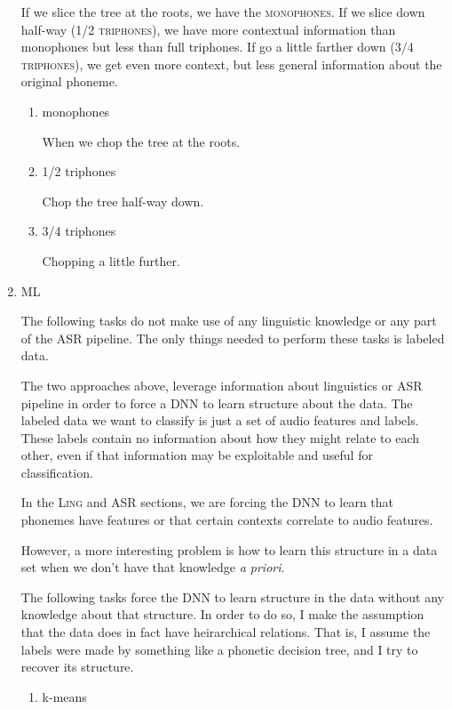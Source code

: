 \documentclass[10pt,a4paper]{article}
\begin{document}
\begin{enumerate}
  If we slice the tree at the roots, we have the \textsc{monophones}. If we slice down half-way (\textsc{1/2 triphones}), we have more contextual information than monophones but less than full triphones. If go a little farther down (\textsc{3/4 triphones}), we get even more context, but less general information about the original phoneme.
  
  \begin{enumerate}
  \item monophones

    When we chop the tree at the roots.
    
  \item 1/2 triphones

    Chop the tree half-way down.
    
  \item 3/4 triphones

    Chopping a little further.
    
  \end{enumerate}

\item \textsc{ML}

  The following tasks do not make use of any linguistic knowledge or any part of the ASR pipeline. The only things needed to perform these tasks is labeled data.

  The two approaches above, leverage information about linguistics or ASR pipeline in order to force a DNN to learn structure about the data. The labeled data we want to classify is just a set of audio features and labels. These labels contain no information about how they might relate to each other, even if that information may be exploitable and useful for classification.

  In the \textsc{Ling} and \textsc{ASR} sections, we are forcing the DNN to learn that phonemes have features or that certain contexts correlate to audio features.

  However, a more interesting problem is how to learn this structure in a data set when we don't have that knowledge \textit{a priori}.

  The following tasks force the DNN to learn structure in the data without any knowledge about that structure. In order to do so, I make the assumption that the data does in fact have heirarchical relations. That is, I assume the labels were made by something like a phonetic decision tree, and I try to recover its structure.
  
  \begin{enumerate}
  \item k-means


\end{enumerate}
\end{enumerate}
\end{document}

